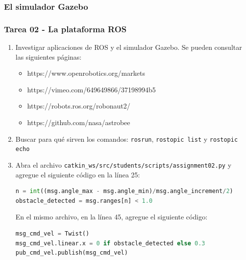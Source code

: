 \begin{frame}\frametitle{El simulador Gazebo}
  
\end{frame}

\begin{frame}[containsverbatim]\frametitle{Tarea 02 - La plataforma ROS}
  \begin{enumerate}
  \item Investigar aplicaciones de ROS y el simulador Gazebo. Se pueden consultar las siguientes páginas:
    \begin{itemize}
    \item https://www.openrobotics.org/markets
    \item https://vimeo.com/649649866/37198994b5
    \item https://robots.ros.org/robonaut2/
    \item https://github.com/nasa/astrobee
    \end{itemize}
  \item Buscar para qué sirven los comandos: \texttt{rosrun}, \texttt{rostopic list} y \texttt{rostopic echo}
  \item Abra el archivo \texttt{catkin\_ws/src/students/scripts/assignment02.py} y agregue el siguiente código en la línea 25:
    \begin{lstlisting}[language=Python,firstnumber=25]
n = int((msg.angle_max - msg.angle_min)/msg.angle_increment/2)
obstacle_detected = msg.ranges[n] < 1.0
  \end{lstlisting}
  En el mismo archivo, en la línea 45, agregue el siguiente código:
  \begin{lstlisting}[language=Python,firstnumber=45]
msg_cmd_vel = Twist()
msg_cmd_vel.linear.x = 0 if obstacle_detected else 0.3
pub_cmd_vel.publish(msg_cmd_vel)
  \end{lstlisting}
  \end{enumerate}
\end{frame}

